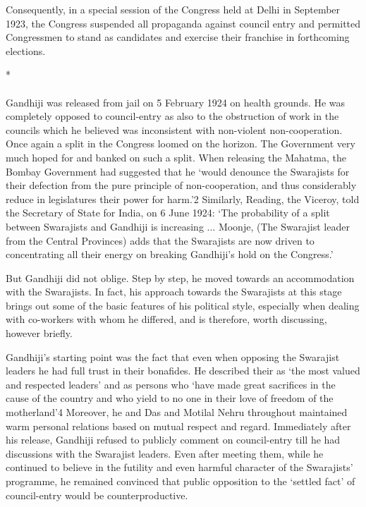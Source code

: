\begin{multicols}{2}
Consequently, in a special session of the Congress held at Delhi in September 1923, the Congress suspended all propaganda against council entry and permitted Congressmen to stand as candidates and exercise their franchise in forthcoming elections.

\begin{center}*\end{center}

\paragraph*{}

Gandhiji was released from jail on 5 February 1924 on health grounds. He was completely opposed to council-entry as also to the obstruction of work in the councils which he believed was inconsistent with non-violent non-cooperation. Once again a split in the Congress loomed on the horizon. The Government very much hoped for and banked on such a split. When releasing the Mahatma, the Bombay Government had suggested that he `would denounce the Swarajists for their defection from the pure principle of non-cooperation, and thus considerably reduce in legislatures their power for harm.'2 Similarly, Reading, the Viceroy, told the Secretary of State for India, on 6 June 1924: `The probability of a split between Swarajists and Gandhiji is increasing ... Moonje, (The Swarajist leader from the Central Provinces) adds that the Swarajists are now driven to concentrating all their energy on breaking Gandhiji's hold on the Congress.'

But Gandhiji did not oblige. Step by step, he moved towards an accommodation with the Swarajists. In fact, his approach towards the Swarajists at this stage brings out some of the basic features of his political style, especially when dealing with co-workers with whom he differed, and is therefore, worth discussing, however briefly.

Gandhiji's starting point was the fact that even when opposing the Swarajist leaders he had full trust in their bonafides. He described their as `the most valued and respected leaders' and as persons who `have made great sacrifices in the cause of the country and who yield to no one in their love of freedom of the motherland'4 Moreover, he and Das and Motilal Nehru throughout maintained warm personal relations based on mutual respect and regard. Immediately after his release, Gandhiji refused to publicly comment on council-entry till he had discussions with the Swarajist leaders. Even after meeting them, while he continued to believe in the futility and even harmful character of the Swarajists' programme, he remained convinced that public opposition to the `settled fact' of council-entry would be counterproductive.


\end{multicols}
